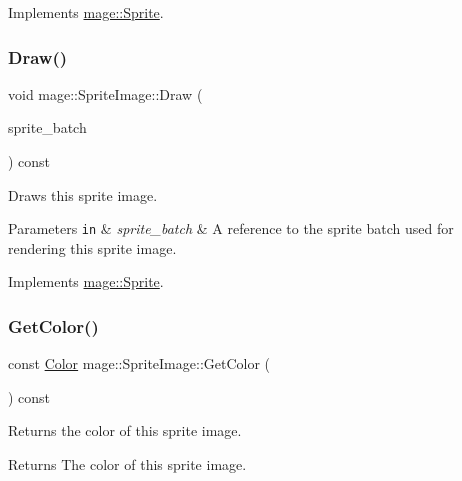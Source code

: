Implements \hyperlink{classmage_1_1_sprite_a214890d7da493bccadb2327b8c7ffb09}{mage\+::\+Sprite}.

\hypertarget{classmage_1_1_sprite_image_ae30d3293931f674fea17008063755bb6}{}\label{classmage_1_1_sprite_image_ae30d3293931f674fea17008063755bb6} 
\subsubsection{\texorpdfstring{Draw()}{Draw()}}
{\footnotesize\ttfamily void mage\+::\+Sprite\+Image\+::\+Draw (\begin{DoxyParamCaption}\item[{Sprite\+Batch \&}]{sprite\+\_\+batch }\end{DoxyParamCaption}) const\hspace{0.3cm}{\ttfamily [virtual]}}

Draws this sprite image.


\begin{DoxyParams}[1]{Parameters}
\mbox{\tt in}  & {\em sprite\+\_\+batch} & A reference to the sprite batch used for rendering this sprite image. \\
\hline
\end{DoxyParams}


Implements \hyperlink{classmage_1_1_sprite_a954a9f2046edcd6b1658a236ae23ec5a}{mage\+::\+Sprite}.

\hypertarget{classmage_1_1_sprite_image_aa04711b85cbe98493edd8767ac3348b5}{}\label{classmage_1_1_sprite_image_aa04711b85cbe98493edd8767ac3348b5} 
\subsubsection{\texorpdfstring{Get\+Color()}{GetColor()}}
{\footnotesize\ttfamily const \hyperlink{structmage_1_1_color}{Color} mage\+::\+Sprite\+Image\+::\+Get\+Color (\begin{DoxyParamCaption}{ }\end{DoxyParamCaption}) const\hspace{0.3cm}{\ttfamily [noexcept]}}

Returns the color of this sprite image.

\begin{DoxyReturn}{Returns}
The color of this sprite image. 
\end{DoxyReturn}
\hypertarget{classmage_1_1_sprite_image_a65e6a26e2589afa2c6ccc463e7dd4264}{}\label{classmage_1_1_sprite_image_a65e6a26e2589afa2c6ccc463e7dd4264} 
